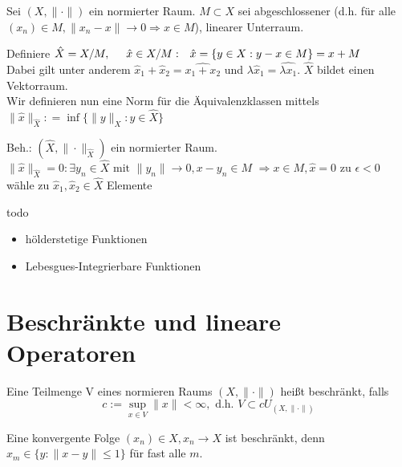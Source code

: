 \begin{definition}[Quotientenräume]
Sei $(X, \| \cdot \|)$ ein normierter Raum. $M \subset X$ sei abgeschlossener (d.h. für alle $(x_{n}) \in M, \| x_{n} - x \| \rightarrow 0 \Rightarrow x \in M$), linearer Unterraum. 

Definiere $\hat X = X / M, \hspace{0.5cm} \hat x \in X/M: \hspace{0.25cm} \hat x = \{ y \in X: y - x \in M \} = x + M$ \\
Dabei gilt unter anderem $\hat x_{1} + \hat x_{2} = \hat{x_{1} + x_{2}}$ und $\lambda \hat x_{1} = \hat{\lambda x_{1}}$. $\hat X$ bildet einen Vektorraum. \\

Wir definieren nun eine Norm für die Äquivalenzklassen mittels $\| \hat x \|_{\hat X} : = \inf \{ \| y \|_{X}: y \in \hat X \}$

Beh.: $(\hat X, \| \cdot \|_{\hat X})$ ein normierter Raum. \\
$\| \hat x \|_{\hat X} = 0: \exists y_{n} \in \hat X \text{ mit } \| y_{n} \| \rightarrow 0, x - y_{n} \in M$
$\Rightarrow x \in M, \hat x = 0$
zu $\epsilon< 0$ wähle zu $\hat x_{1}, \hat x_{2} \in \hat X$ Elemente 

todo
\end{definition}

\begin{beispiel}
\begin{itemize}
	\item hölderstetige Funktionen
	\item Lebesgues-Integrierbare Funktionen
\end{itemize}
\end{beispiel}


\newpage
\section{Beschränkte und lineare Operatoren}

\begin{definition}
	Eine Teilmenge V eines normieren Raums $(X, \| \cdot \|)$ heißt beschränkt, falls 
	\[ c := \sup_{x \in V} \| x \| < \infty, \text{ d.h. } V \subset c U_{(X, \| \cdot \| )} \]
\end{definition}

\begin{bemerkung}
Eine konvergente Folge $(x_{n})	\in X, x_{n} \rightarrow X$ ist beschränkt, denn $x_{m} \in \{ y: \| x - y \| \leq 1 \}$ für fast alle $m$.
\end{bemerkung}


